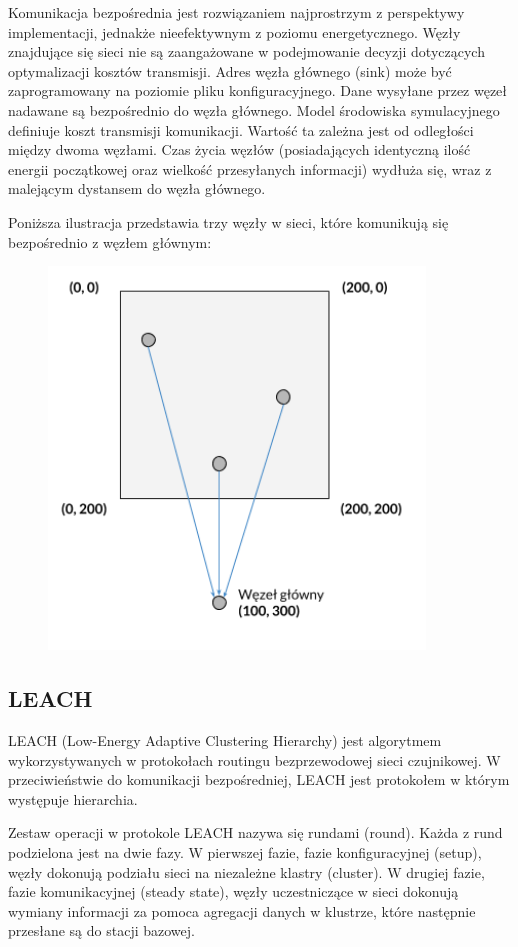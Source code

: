 \documentclass[a4paper,12pt,twoside,openany]{report}
\begin{document}
Komunikacja bezpośrednia jest rozwiązaniem najprostrzym z perspektywy implementacji, jednakże nieefektywnym z poziomu energetycznego. 
Węzły znajdujące się sieci nie są zaangażowane w podejmowanie decyzji dotyczących optymalizacji kosztów transmisji. 
Adres węzła głównego (sink) może być zaprogramowany na poziomie pliku konfiguracyjnego.
Dane wysyłane przez węzeł nadawane są bezpośrednio do węzła głównego.
Model środowiska symulacyjnego definiuje koszt transmisji komunikacji. Wartość ta zależna jest od odległości między dwoma węzłami.
Czas życia węzłów (posiadających identyczną ilość energii początkowej oraz wielkość przesyłanych informacji) wydłuża się, wraz z malejącym dystansem do węzła głównego.

Poniższa ilustracja przedstawia trzy węzły w sieci, które komunikują się bezpośrednio z węzłem głównym:

\begin{figure}[H]
 \centering
 \includegraphics[width=10cm]{images/komunikacja_bezposrednia.png}
\end{figure}

\subsection{LEACH}

LEACH (Low-Energy Adaptive Clustering Hierarchy) jest algorytmem wykorzystywanych w protokołach routingu bezprzewodowej sieci czujnikowej.
W przeciwieństwie do komunikacji bezpośredniej, LEACH jest protokołem w którym występuje hierarchia. 

Zestaw operacji w protokole LEACH nazywa się rundami (round). Każda z rund podzielona jest na dwie fazy.
W pierwszej fazie, fazie konfiguracyjnej (setup), węzły dokonują podziału sieci na niezależne klastry (cluster).
W drugiej fazie, fazie komunikacyjnej (steady state), węzły uczestniczące w sieci dokonują wymiany informacji za pomoca agregacji danych w klustrze, które następnie
przesłane są do stacji bazowej.
\end{document}
